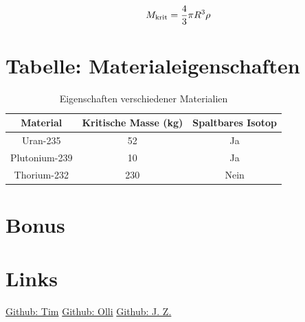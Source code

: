 \documentclass[a4paper,12pt]{article}
\begin{document}
\begin{equation}
    \fontsize{20}{10}
    M_\text{krit} = \frac{4}{3} \pi R^3 \rho
    \label{eq:kritische_masse}
\end{equation}

\newpage
\clearpage

\section{Tabelle: Materialeigenschaften}
\begin{table}[h]
    \centering
    \begin{tabular}{|c|c|c|}
    \hline
    Material & Kritische Masse (kg) & Spaltbares Isotop \\
    \hline
    Uran-235 & 52 & Ja \\
    Plutonium-239 & 10 & Ja \\
    Thorium-232 & 230 & Nein \\
    \hline
    \end{tabular}
    \caption{Eigenschaften verschiedener Materialien}
\end{table}

\section{Bonus}

\newpage

\section{Links}
\begin{center}
\end{center}
\bigskip

\href{https://github.com/Tim-foe}{Github: Tim} \hspace{4cm}
\href{https://github.com/YoOlli}{Github: Olli} \hspace{4cm}
\href{https://github.com/Jason4225}{Github: J. Z.}

%
%
\end{document}
